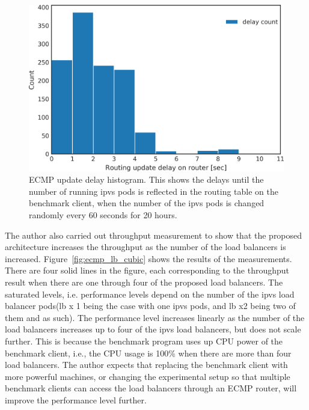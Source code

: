 \begin{figure}[h]
  \centering
  \includegraphics[width=0.9\columnwidth]{Figs/ecmp_delay_histgram}
  \par\bigskip
  \centering
  \begin{minipage}{0.9\columnwidth}
    \caption[ECMP update delay histogram]{
      ECMP update delay histogram.
      This shows the delays until the number of running ipvs pods is reflected in the routing table on the benchmark client, when the number of the ipvs pods is changed randomly every 60 seconds for 20 hours.
    }
    \label{fig:ecmp_delay_histgram}
  \end{minipage}
\end{figure}

The author also carried out throughput measurement to show that the proposed architecture increases the throughput as the number of the load balancers is increased.
Figure~\ref{fig:ecmp_lb_cubic} shows the results of the measurements.
There are four solid lines in the figure, each corresponding to the throughput result when there are one through four of the proposed load balancers.
The saturated levels, i.e. performance levels depend on the number of the ipvs load balancer pods(lb x 1 being the case with one ipvs pods, and lb x2 being two of them and as such). 
The performance level increases linearly as the number of the load balancers increases up to four of the ipvs load balancers, but does not scale further.
This is because the benchmark program uses up CPU power of the benchmark client, i.e., the CPU usage is 100\% when there are more than four load balancers.
The author expects that replacing the benchmark client with more powerful machines, or changing the experimental setup so that multiple benchmark clients can access the load balancers through an ECMP router, will improve the performance level further.

